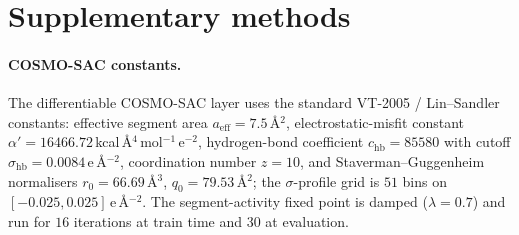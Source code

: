 
\section{Supplementary methods}
\label{sec:si-methods}

\paragraph{COSMO-SAC constants.} The differentiable COSMO-SAC layer uses the standard
VT-2005 / Lin--Sandler constants: effective segment area $a_{\mathrm{eff}}=7.5$\,\AA$^2$,
electrostatic-misfit constant $\alpha'=16466.72$\,kcal\,\AA$^4$\,mol$^{-1}$\,e$^{-2}$,
hydrogen-bond coefficient $c_{\mathrm{hb}}=85580$ with cutoff
$\sigma_{\mathrm{hb}}=0.0084$\,e\,\AA$^{-2}$, coordination number $z=10$, and
Staverman--Guggenheim normalisers $r_0=66.69$\,\AA$^3$, $q_0=79.53$\,\AA$^2$; the
$\sigma$-profile grid is $51$ bins on $[-0.025,0.025]$\,e\,\AA$^{-2}$. The segment-activity
fixed point is damped ($\lambda=0.7$) and run for $16$ iterations at train time and $30$
at evaluation.
